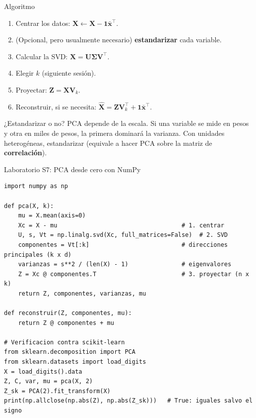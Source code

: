 \documentclass[aspectratio=169,11pt]{beamer}
\newcommand{\x}{\bm{x}}
\newcommand{\X}{\mathbf{X}}
\begin{document}
\begin{frame}{Algoritmo}
  \begin{enumerate}
    \item Centrar los datos: $\X \leftarrow \X - \mathbf{1}\bar{\x}^\top$.
    \item (Opcional, pero usualmente necesario) \textbf{estandarizar} cada variable.
    \item Calcular la SVD: $\X = \mathbf{U}\boldsymbol{\Sigma}\mathbf{V}^\top$.
    \item Elegir $k$ (siguiente sesión).
    \item Proyectar: $\mathbf{Z} = \X\mathbf{V}_k$.
    \item Reconstruir, si se necesita: $\hat{\X} = \mathbf{Z}\mathbf{V}_k^\top + \mathbf{1}\bar{\x}^\top$.
  \end{enumerate}
  \vspace{6pt}
  \begin{alertblock}{¿Estandarizar o no?}
    PCA depende de la escala. Si una variable se mide en pesos y otra en miles de pesos,
    la primera dominará la varianza. Con unidades heterogéneas, estandarizar
    (equivale a hacer PCA sobre la matriz de \textbf{correlación}).
  \end{alertblock}
\end{frame}

\begin{frame}[fragile]{Laboratorio S7: PCA desde cero con NumPy}
\begin{lstlisting}
import numpy as np

def pca(X, k):
    mu = X.mean(axis=0)
    Xc = X - mu                                   # 1. centrar
    U, s, Vt = np.linalg.svd(Xc, full_matrices=False)  # 2. SVD
    componentes = Vt[:k]                          # direcciones principales (k x d)
    varianzas = s**2 / (len(X) - 1)               # eigenvalores
    Z = Xc @ componentes.T                        # 3. proyectar (n x k)
    return Z, componentes, varianzas, mu

def reconstruir(Z, componentes, mu):
    return Z @ componentes + mu

# Verificacion contra scikit-learn
from sklearn.decomposition import PCA
from sklearn.datasets import load_digits
X = load_digits().data
Z, C, var, mu = pca(X, 2)
Z_sk = PCA(2).fit_transform(X)
print(np.allclose(np.abs(Z), np.abs(Z_sk)))   # True: iguales salvo el signo
\end{lstlisting}
\end{frame}
\end{document}
